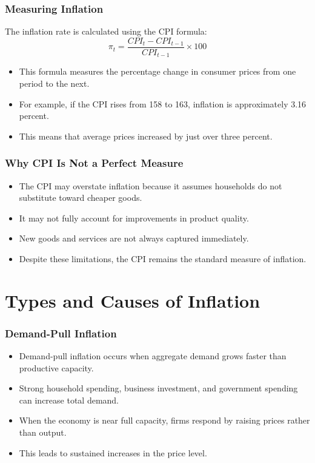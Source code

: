 \documentclass[aspectratio=169]{beamer}
\begin{document}
\begin{frame}
\transfade
\frametitle{Measuring Inflation}
The inflation rate is calculated using the CPI formula:
\[
\pi_t = \frac{CPI_t - CPI_{t-1}}{CPI_{t-1}} \times 100
\]
\begin{itemize}[<+->]
\item This formula measures the percentage change in consumer prices from one period to the next.
\item For example, if the CPI rises from 158 to 163, inflation is approximately 3.16 percent.
\item This means that average prices increased by just over three percent.
\end{itemize}
\end{frame}

\begin{frame}
\transfade
\frametitle{Why CPI Is Not a Perfect Measure}
\begin{itemize}[<+->]
\item The CPI may overstate inflation because it assumes households do not substitute toward cheaper goods.
\item It may not fully account for improvements in product quality.
\item New goods and services are not always captured immediately.
\item Despite these limitations, the CPI remains the standard measure of inflation.
\end{itemize}
\end{frame}



\section{Types and Causes of Inflation}

\begin{frame}
\transfade
\frametitle{Demand-Pull Inflation}
\begin{itemize}[<+->]
\item Demand-pull inflation occurs when aggregate demand grows faster than productive capacity.
\item Strong household spending, business investment, and government spending can increase total demand.
\item When the economy is near full capacity, firms respond by raising prices rather than output.
\item This leads to sustained increases in the price level.
\end{itemize}
\end{frame}
\end{document}
